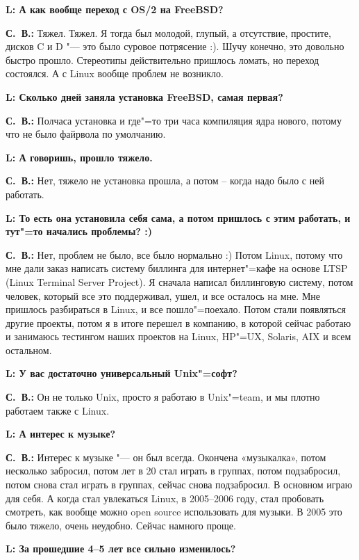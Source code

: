 \documentclass[10pt, a5paper]{article}
\begin{document}
{\noindent \bf L: А как вообще переход с OS/2 на FreeBSD?}

{\noindent \bf С.~В.:} Тяжел. Тяжел. Я тогда был молодой, глупый, а отсутствие, простите, дисков C и D "--- это было суровое потрясение :). Шучу конечно, это довольно быстро прошло. Стереотипы действительно пришлось ломать, но переход состоялся. А с Linux вообще проблем не возникло.

{\noindent \bf L: Сколько дней заняла установка FreeBSD, самая первая?}

{\noindent \bf С.~В.:} Полчаса установка и где"=то три часа компиляция ядра нового, потому что не было файрвола по умолчанию. 

{\noindent \bf L: А говоришь, прошло тяжело.}

{\noindent \bf С.~В.:} Нет, тяжело не установка прошла, а потом – когда надо было с ней работать.

{\noindent \bf L: То есть она установила себя сама, а потом пришлось с этим работать, и тут"=то начались проблемы? :)}

{\noindent \bf С.~В.:} Нет, проблем не было, все было нормально :) Потом Linux, потому что мне дали заказ написать систему биллинга для интернет"=кафе на основе LTSP (Linux Terminal Server Project). Я сначала написал биллинговую систему, потом человек, который все это поддерживал, ушел, и все осталось на мне. Мне пришлось разбираться в Linux, и все пошло"=поехало. Потом стали появляться другие проекты, потом я в итоге перешел в компанию, в которой сейчас работаю и занимаюсь тестингом наших проектов на Linux, HP"=UX, Solaris, AIX и всем остальном.

{\noindent \bf L: У вас достаточно универсальный Unix"=софт?}

{\noindent \bf С.~В.:} Он не только Unix, просто я работаю в Unix"=team, и мы плотно работаем также с Linux.

{\noindent \bf L: А интерес к музыке?}

{\noindent \bf С.~В.:} Интерес к музыке "--- он был всегда. Окончена «музыкалка», потом несколько забросил, потом лет в 20 стал играть в группах, потом подзабросил, потом снова стал играть в группах, сейчас снова подзабросил. В основном играю для себя. А когда стал увлекаться Linux, в 2005--2006 году, стал пробовать смотреть, как вообще можно open source использовать для музыки. В 2005 это было тяжело, очень неудобно. Сейчас намного проще. 

{\noindent \bf L: За прошедшие 4--5 лет все сильно изменилось?}
\end{document}
